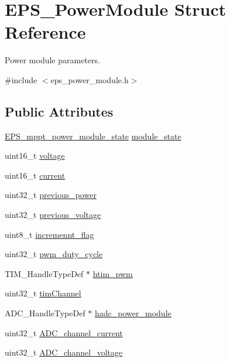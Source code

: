 \hypertarget{struct_e_p_s___power_module}{\section{E\-P\-S\-\_\-\-Power\-Module Struct Reference}
\label{struct_e_p_s___power_module}
}


Power module parameters.  




{\ttfamily \#include $<$eps\-\_\-power\-\_\-module.\-h$>$}

\subsection*{Public Attributes}
\begin{DoxyCompactItemize}
\item 
\hyperlink{group__eps__power__module_gadd75354311e873b06e0f85b643c5cea2}{E\-P\-S\-\_\-mppt\-\_\-power\-\_\-module\-\_\-state} \hyperlink{struct_e_p_s___power_module_a9a52d5c5d5ced69c7df0f68217deffe9}{module\-\_\-state}
\item 
uint16\-\_\-t \hyperlink{struct_e_p_s___power_module_a3a08d6acca23d042f74a0226b0eb9f60}{voltage}
\item 
uint16\-\_\-t \hyperlink{struct_e_p_s___power_module_a641fa79c7e6e507facb56591efb6f5c2}{current}
\item 
uint32\-\_\-t \hyperlink{struct_e_p_s___power_module_a2b2a75d0b1e63c0bcbed3261fd416e86}{previous\-\_\-power}
\item 
uint32\-\_\-t \hyperlink{struct_e_p_s___power_module_afb65c6bd90e52b0ecaca4594124170e2}{previous\-\_\-voltage}
\item 
uint8\-\_\-t \hyperlink{struct_e_p_s___power_module_af6a8b8e716cbb721a278fe363ef6e419}{incremennt\-\_\-flag}
\item 
uint32\-\_\-t \hyperlink{struct_e_p_s___power_module_a52c830161b366fecd8d4307c5a33a287}{pwm\-\_\-duty\-\_\-cycle}
\item 
T\-I\-M\-\_\-\-Handle\-Type\-Def $\ast$ \hyperlink{struct_e_p_s___power_module_a5ad473552e5fd9414c52f36b79303166}{htim\-\_\-pwm}
\item 
uint32\-\_\-t \hyperlink{struct_e_p_s___power_module_a8322d9097b46a1eb94ce87e57dc4dea4}{tim\-Channel}
\item 
A\-D\-C\-\_\-\-Handle\-Type\-Def $\ast$ \hyperlink{struct_e_p_s___power_module_af8e5b3c170ecdd8170ec7186b923dc96}{hadc\-\_\-power\-\_\-module}
\item 
uint32\-\_\-t \hyperlink{struct_e_p_s___power_module_a97992f5d4595a30086e1c7c1ee0d1225}{A\-D\-C\-\_\-channel\-\_\-current}
\item 
uint32\-\_\-t \hyperlink{struct_e_p_s___power_module_a01f651d33935804c5c6b32d063c09c9a}{A\-D\-C\-\_\-channel\-\_\-voltage}
\end{DoxyCompactItemize}


